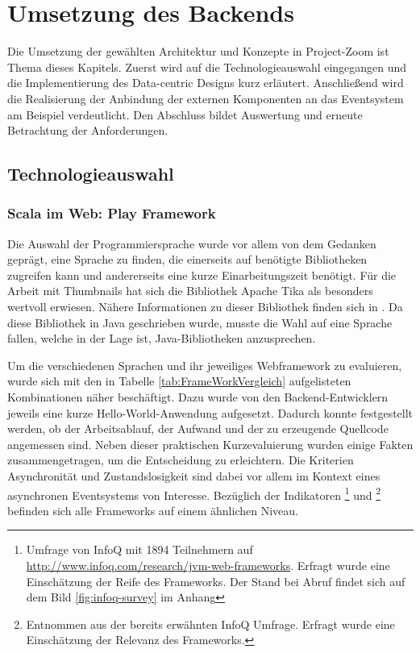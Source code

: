 \chapter{Umsetzung des Backends}

Die Umsetzung der gewählten Architektur und Konzepte in Project-Zoom ist Thema dieses Kapitels. Zuerst wird auf die Technologieauswahl eingegangen und die Implementierung des Data-centric Designs kurz erläutert. Anschließend wird die Realisierung der Anbindung der externen Komponenten an das Eventsystem am Beispiel verdeutlicht. Den Abschluss bildet Auswertung und erneute Betrachtung der Anforderungen. 

\section{Technologieauswahl}

\subsection{Scala im Web: Play Framework}
Die Auswahl der Programmiersprache wurde vor allem von dem Gedanken geprägt, eine Sprache zu finden, die einerseits auf benötigte Bibliotheken zugreifen kann und andererseits eine kurze Einarbeitungszeit benötigt. Für die Arbeit mit Thumbnails hat sich die Bibliothek Apache Tika als besonders wertvoll erwiesen. Nähere Informationen zu dieser Bibliothek finden sich in \cite{bp-dome}. Da diese Bibliothek in Java geschrieben wurde, musste die Wahl auf eine Sprache fallen, welche in der Lage ist, Java-Bibliotheken anzusprechen. 

Um die verschiedenen Sprachen und ihr jeweiliges Webframework zu evaluieren, wurde sich mit den in Tabelle \ref{tab:FrameWorkVergleich} aufgelisteten Kombinationen näher beschäftigt. Dazu wurde von den Backend-Entwicklern jeweils eine kurze Hello-World-Anwendung aufgesetzt. Dadurch konnte festgestellt werden, ob der Arbeitsablauf, der Aufwand und der zu erzeugende Quellcode angemessen sind. Neben dieser praktischen Kurzevaluierung wurden einige Fakten zusammengetragen, um die Entscheidung zu erleichtern. Die Kriterien Asynchronität und Zustandslosigkeit sind dabei vor allem im Kontext eines asynchronen Eventsystems von Interesse. Bezüglich der Indikatoren \footnote{Umfrage von InfoQ mit 1894 Teilnehmern auf \url{http://www.infoq.com/research/jvm-web-frameworks}. Erfragt wurde eine Einschätzung der Reife des Frameworks. Der Stand bei Abruf findet sich auf dem Bild \ref{fig:infoq-survey} im Anhang} und \footnote{Entnommen aus der bereits erwähnten InfoQ Umfrage. Erfragt wurde eine Einschätzung der Relevanz des Frameworks.} befinden sich alle Frameworks auf einem ähnlichen Niveau. 


